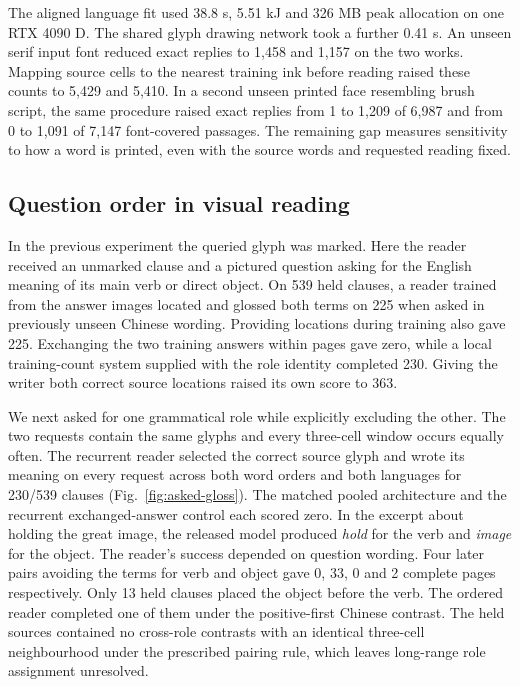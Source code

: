\documentclass[12pt,a4paper]{article}
\providecommand{\DIFadd}[1]{{\protect\color{blue} \sf #1}} %
\begin{document}
\DIFadd{The aligned language fit used 38.8 s, 5.51 kJ and 326 MB peak allocation on one RTX 4090 D. The shared glyph drawing network took a further 0.41 s. An unseen serif input font reduced exact replies to 1,458 and 1,157 on the two works. Mapping source cells to the nearest training ink before reading raised these counts to 5,429 and 5,410. In a second unseen printed face resembling brush script, the same procedure raised exact replies from 1 to 1,209 of 6,987 and from 0 to 1,091 of 7,147 font-covered passages. The remaining gap measures sensitivity to how a word is printed, even with the source words and requested reading fixed.
}

\subsection*{\DIFadd{Question order in visual reading}}
\DIFadd{In the previous experiment the queried glyph was marked. Here the reader received an unmarked clause and a pictured question asking for the English meaning of its main verb or direct object. On 539 held clauses, a reader trained from the answer images located and glossed both terms on 225 when asked in previously unseen Chinese wording. Providing locations during training also gave 225. Exchanging the two training answers within pages gave zero, while a local training-count system supplied with the role identity completed 230. Giving the writer both correct source locations raised its own score to 363.
}

\DIFadd{We next asked for one grammatical role while explicitly excluding the other. The two requests contain the same glyphs and every three-cell window occurs equally often. The recurrent reader selected the correct source glyph and wrote its meaning on every request across both word orders and both languages for 230/539 clauses (Fig.~\ref{fig:asked-gloss}). The matched pooled architecture and the recurrent exchanged-answer control each scored zero. In the excerpt about holding the great image, the released model produced \textit{hold} for the verb and \textit{image} for the object. The reader's success depended on question wording. Four later pairs avoiding the terms for verb and object gave 0, 33, 0 and 2 complete pages respectively. Only 13 held clauses placed the object before the verb. The ordered reader completed one of them under the positive-first Chinese contrast. The held sources contained no cross-role contrasts with an identical three-cell neighbourhood under the prescribed pairing rule, which leaves long-range role assignment unresolved.
}
\end{document}
